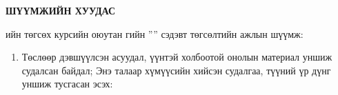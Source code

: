 \begin{titlepage}
\begin{center}

{\scshape\Large \univname\par} %
{\scshape\large \facname\par}\vspace{1cm} %

\textbf{{\Large ШҮҮМЖИЙН ХУУДАС}}\\[1cm]

\end{center}

\normalsize

\deptname ийн төгсөх курсийн оюутан \shortname гийн ''\ttitle'' сэдэвт төгсөлтийн ажлын шүүмж:

\begin{enumerate}
\item Төслөөр дэвшүүлсэн асуудал, үүнтэй холбоотой онолын материал уншиж судалсан байдал; Энэ талаар хүмүүсийн хийсэн судалгаа, түүний үр дүнг уншиж тусгасан эсэх:
\begin{center}
\dotfill \\[0.1cm]
\dotfill \\[0.1cm]
\dotfill \\[0.1cm]
\dotfill \\[0.1cm]
\dotfill \\[0.1cm]
\dotfill \\[0.1cm]


\end{center}
\end{enumerate}
\end{titlepage}
